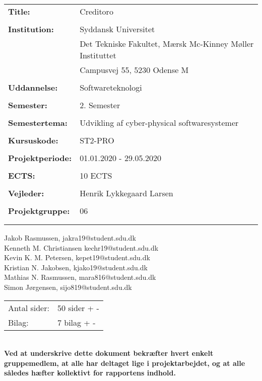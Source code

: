 \noindent
\begin{tabular}{@{}l l} 
\textbf{Title:} & Creditoro \\
& \\
\textbf{Institution:} & Syddansk Universitet \\
& Det Tekniske Fakultet, Mærsk Mc-Kinney Møller Instituttet \\
& Campusvej 55, 5230 Odense M \\
& \\
\textbf{Uddannelse:} & Softwareteknologi \\
& \\
\textbf{Semester:} & 2. Semester \\
& \\
\textbf{Semestertema:} & Udvikling af cyber-physical softwaresystemer \\
& \\
\textbf{Kursuskode:} & ST2-PRO \\
& \\
\textbf{Projektperiode:} &  01.01.2020 - 29.05.2020\\
& \\
\textbf{ECTS:} & 10 ECTS\\
& \\
\textbf{Vejleder:} & Henrik Lykkegaard Larsen\\
& \\
\textbf{Projektgruppe:} & 06\\
& \\

\\
\end{tabular}
\noindent
Jakob Rasmussen, jakra19@student.sdu.dk\\

\noindent
Kenneth M. Christiansen kechr19@student.sdu.dk\\

\noindent
Kevin K. M. Petersen, kepet19@student.sdu.dk\\

\noindent
Kristian N. Jakobsen, kjako19@student.sdu.dk\\

\noindent
Mathias N. Rasmussen, mara816@student.sdu.dk\\

\noindent
Simon Jørgensen, sijo819@student.sdu.dk\\

\noindent
\begin{tabular}{@{}l l}
Antal sider:    & 50 sider + -  \\
Bilag:          & 7 bilag + - 
\end{tabular}
\\

\noindent
\textbf{Ved at underskrive dette dokument bekræfter hvert enkelt gruppemedlem, at alle
har deltaget lige i projektarbejdet, og at alle således hæfter kollektivt for rapportens indhold.}
